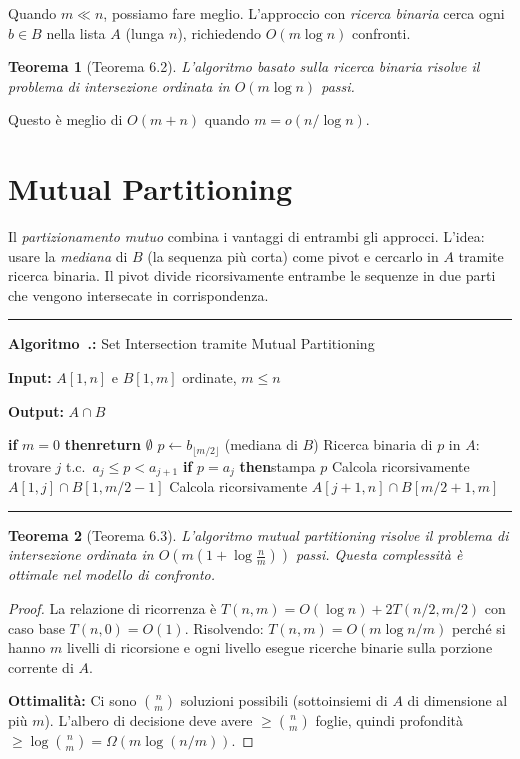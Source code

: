 \documentclass[12pt, a4paper, oneside]{book}
\newcounter{algocf}[chapter]
\renewcommand{\thealgocf}{\thechapter.\arabic{algocf}}
\newenvironment{algorithm}[1][H]{%
  \refstepcounter{algocf}%
  \par\medskip\noindent\rule{\linewidth}{0.4pt}\par\smallskip
}{%
  \par\smallskip\noindent\rule{\linewidth}{0.4pt}\par\medskip
}
\newcommand{\algcaption}[1]{\noindent\textbf{Algoritmo~\thealgocf:} #1\par\smallskip}
\newcommand{\KwIn}[1]{\noindent\textbf{Input:} #1\par}
\newcommand{\KwOut}[1]{\noindent\textbf{Output:} #1\par}
\newcommand{\If}[1]{\noindent\textbf{if} #1 \textbf{then}}
\newcommand{\Return}[1]{\noindent\textbf{return} #1}
\theoremstyle{plain}
\newtheorem{teorema}{Teorema}[chapter]
\theoremstyle{definition}
\theoremstyle{remark}
\begin{document}
Quando $m \ll n$, possiamo fare meglio. L'approccio con \emph{ricerca binaria} cerca ogni $b \in B$ nella lista $A$ (lunga $n$), richiedendo $O(m \log n)$ confronti.

\begin{teorema}[Teorema 6.2]
L'algoritmo basato sulla ricerca binaria risolve il problema di intersezione ordinata in $O(m \log n)$ passi.
\end{teorema}

Questo è meglio di $O(m + n)$ quando $m = o(n / \log n)$.

\section{Mutual Partitioning}

Il \emph{partizionamento mutuo} combina i vantaggi di entrambi gli approcci. L'idea: usare la \emph{mediana} di $B$ (la sequenza più corta) come pivot e cercarlo in $A$ tramite ricerca binaria. Il pivot divide ricorsivamente entrambe le sequenze in due parti che vengono intersecate in corrispondenza.

\begin{algorithm}[H]
\algcaption{Set Intersection tramite Mutual Partitioning}
\KwIn{$A[1,n]$ e $B[1,m]$ ordinate, $m \le n$}
\KwOut{$A \cap B$}
\If{$m = 0$}{\Return{$\emptyset$}\;}
$p \leftarrow b_{\lfloor m/2\rfloor}$ (mediana di $B$)\;
Ricerca binaria di $p$ in $A$: trovare $j$ t.c.\ $a_j \le p < a_{j+1}$\;
\If{$p = a_j$}{stampa $p$\;}
Calcola ricorsivamente $A[1,j] \cap B[1, m/2 - 1]$\;
Calcola ricorsivamente $A[j+1, n] \cap B[m/2 + 1, m]$\;
\end{algorithm}

\begin{teorema}[Teorema 6.3]
L'algoritmo mutual partitioning risolve il problema di intersezione ordinata in $O\!\left(m\!\left(1 + \log\frac{n}{m}\right)\right)$ passi. Questa complessità è ottimale nel modello di confronto.
\end{teorema}

\begin{proof}
La relazione di ricorrenza è $T(n, m) = O(\log n) + 2T(n/2, m/2)$ con caso base $T(n, 0) = O(1)$. Risolvendo: $T(n, m) = O(m \log n/m)$ perché si hanno $m$ livelli di ricorsione e ogni livello esegue ricerche binarie sulla porzione corrente di $A$.

\noindent\textbf{Ottimalità:} Ci sono $\binom{n}{m}$ soluzioni possibili (sottoinsiemi di $A$ di dimensione al più $m$). L'albero di decisione deve avere $\ge \binom{n}{m}$ foglie, quindi profondità $\ge \log\binom{n}{m} = \Omega(m \log(n/m))$.
\end{proof}
\end{document}
